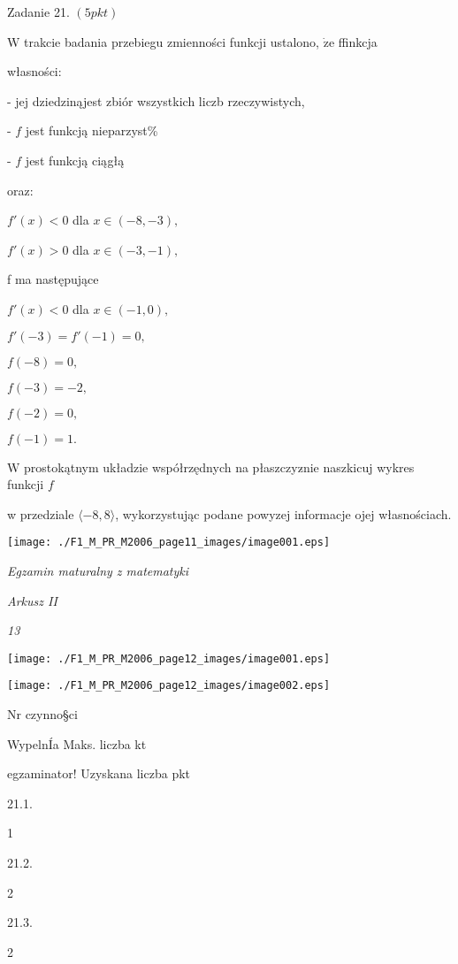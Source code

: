 \documentclass[a4paper,12pt]{article}
\begin{document}
Zadanie 21. $(5pkt)$

$\mathrm{W}$ trakcie badania przebiegu zmienności funkcji ustalono, $\dot{\mathrm{z}}\mathrm{e}$ ffinkcja

własności:

- jej dziedzinąjest zbiór wszystkich liczb rzeczywistych,

- $f$ jest funkcją nieparzyst\%

- $f$ jest funkcją ciągłą

oraz:

$f'(x)<0$ dla $x\in(-8,-3),$

$f'(x)>0$ dla $x\in(-3,-1),$

f ma następujące

$f'(x)<0$ dla $x\in(-1,0),$

$f'(-3)=f'(-1)=0,$

$f(-8)=0,$

$f(-3)=-2,$

$f(-2)=0,$

$f(-1)=1.$

$\mathrm{W}$ prostokątnym układzie współrzędnych na płaszczyz$\acute{}$nie naszkicuj wykres funkcji $f$

w przedziale $\langle-8,8\rangle$, wykorzystując podane powyzej informacje ojej własnościach.
\begin{center}
\texttt{[image: ./F1\_M\_PR\_M2006\_page11\_images/image001.eps]}
\end{center}




{\it Egzamin maturalny z matematyki}

{\it Arkusz II}

{\it 13}
\begin{center}
\texttt{[image: ./F1\_M\_PR\_M2006\_page12\_images/image001.eps]}

\texttt{[image: ./F1\_M\_PR\_M2006\_page12\_images/image002.eps]}
\end{center}
Nr czynno\S ci

WypelnÍa Maks. liczba kt

egzaminator! Uzyskana liczba pkt

21.1.

1

21.2.

2

21.3.

2
\end{document}
